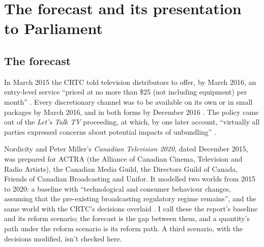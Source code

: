 
\section{The forecast and its presentation to Parliament}
\label{sec:lttv-forecast}

\subsection{The forecast}

In March 2015 the CRTC told television distributors to offer, by March 2016, an entry-level service \enquote{priced at no more than \$25 (not including equipment) per month} \citep[para.~26]{crtc2015worldofchoice}. Every discretionary channel was to be available on its own or in small packages by March 2016, and in both forms by December 2016 \citep[para.~47]{crtc2015worldofchoice}. The policy came out of the \textit{Let's Talk TV} proceeding, at which, by one later account, \enquote{virtually all parties expressed concerns about potential impacts of unbundling} \citep[para.~xxii, p.~5]{nordicity2015television}.

Nordicity and Peter Miller's \textit{Canadian Television 2020}, dated December 2015, was prepared for ACTRA (the Alliance of Canadian Cinema, Television and Radio Artists), the Canadian Media Guild, the Directors Guild of Canada, Friends of Canadian Broadcasting and Unifor. It modelled two worlds from 2015 to 2020: a baseline with \enquote{technological and consumer behaviour changes, assuming that the pre-existing broadcasting regulatory regime remains}, and the same world with the CRTC's decisions overlaid \citep[para.~ii, p.~1]{nordicity2015television}. I call these the report's baseline and its reform scenario; the forecast is the gap between them, and a quantity's path under the reform scenario is its reform path. A third scenario, with the decisions modified, isn't checked here.

